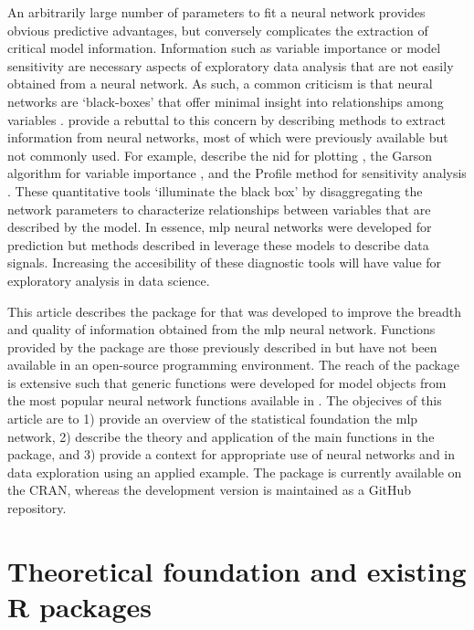 \documentclass[article,shortnames]{jss}\usepackage[]{graphicx}\usepackage[]{color}
\begin{document}
An arbitrarily large number of parameters to fit a neural network provides obvious predictive advantages, but conversely complicates the extraction of critical model information.  Information such as variable importance or model sensitivity are necessary aspects of exploratory data analysis that are not easily obtained from a neural network. As such, a common criticism is that neural networks are `black-boxes' that offer minimal insight into relationships among variables \citep[e.g.,][]{Paruelo97}.  \citet{Olden02} provide a rebuttal to this concern by describing methods to extract information from neural networks, most of which were previously available but not commonly used.  For example, \citet{Olden02} describe  the \ac{nid} for plotting \citep{Ozesmi99}, the Garson algorithm for variable importance \citep{Garson91}, and the Profile method for sensitivity analysis \citep{Lek96}.  These quantitative tools `illuminate the black box' by disaggregating the network parameters to characterize relationships between variables that are described by the model.  In essence, \ac{mlp} neural networks were developed for prediction but methods described in \citep{Olden02} leverage these models to describe data signals.  Increasing the accesibility of these diagnostic tools will have value for exploratory analysis in data science.

This article describes the  package for  that was developed to improve the breadth and quality of information obtained from the \ac{mlp} neural network.  Functions provided by the package are those previously described in \citep{Olden02} but have not been available in an open-source programming environment.  The reach of the package is extensive such that generic functions were developed for model objects from the most popular neural network functions available in .  The objecives of this article are to 1) provide an overview of the statistical foundation the \ac{mlp} network, 2) describe the theory and application of the main functions in the  package, and 3) provide a context for appropriate use of neural networks and  in data exploration using an applied example.  The package is currently available on the \ac{CRAN}, whereas the development version is maintained as a GitHub repository.  

\section[Theoretical foundation]{Theoretical foundation and existing R packages}
\end{document}
